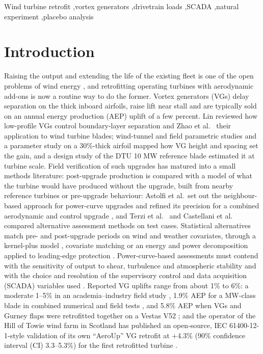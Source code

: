 \documentclass[preprint,12pt]{elsarticle}
\begin{document}
\begin{frontmatter}
\begin{keyword}
Wind turbine retrofit \sep vortex generators \sep drivetrain loads \sep SCADA \sep natural experiment \sep placebo analysis
\end{keyword}

\end{frontmatter}

\linenumbers

\section{Introduction}

Raising the output and extending the life of the existing fleet is one of the open problems of wind energy \cite{veers19}, and retrofitting operating turbines with aerodynamic add-ons is now a routine way to do the former. Vortex generators (VGs) delay separation on the thick inboard airfoils, raise lift near stall and are typically sold on an annual energy production (AEP) uplift of a few percent. Lin \cite{lin02} reviewed how low-profile VGs control boundary-layer separation and Zhao et al.~\cite{zhao} their application to wind turbine blades; wind-tunnel and field parametric studies \cite{mueller} and a parameter study on a 30\%-thick airfoil \cite{baldacchino18} mapped how VG height and spacing set the gain, and a design study of the DTU 10 MW reference blade \cite{skrzypinski14} estimated it at turbine scale. Field verification of such upgrades has matured into a small methods literature: post-upgrade production is compared with a model of what the turbine would have produced without the upgrade, built from nearby reference turbines or pre-upgrade behaviour: Astolfi et al.~set out the neighbour-based approach for power-curve upgrades \cite{astolfi18} and refined its precision for a combined aerodynamic and control upgrade \cite{astolfi19}, and Terzi et al.~\cite{terzi} and Castellani et al.~\cite{castellani} compared alternative assessment methods on test cases. Statistical alternatives match pre- and post-upgrade periods on wind and weather covariates, through a kernel-plus model \cite{lee15}, covariate matching \cite{shin18} or an energy and power decomposition applied to leading-edge protection \cite{latiffianti22}. Power-curve-based assessments must contend with the sensitivity of output to shear, turbulence and atmospheric stability \cite{wagner09,stmartin16} and with the choice and resolution of the supervisory control and data acquisition (SCADA) variables used \cite{gonzalez19,astolfi21}. Reported VG uplifts range from about 1\% to 6\%: a moderate 1--5\% in an academia--industry field study \cite{hwangbo17}, 1.9\% AEP for a MW-class blade in combined numerical and field tests \cite{moon}, and 5.8\% AEP when VGs and Gurney flaps were retrofitted together on a Vestas V52 \cite{manolesos}; and the operator of the Hill of Towie wind farm in Scotland has published an open-source, IEC 61400-12-1-style \cite{iec} validation of its own ``AeroUp'' VG retrofit at +4.3\% (90\% confidence interval (CI) 3.3--5.3\%) for the first retrofitted turbine \cite{clerc}.
\end{document}
